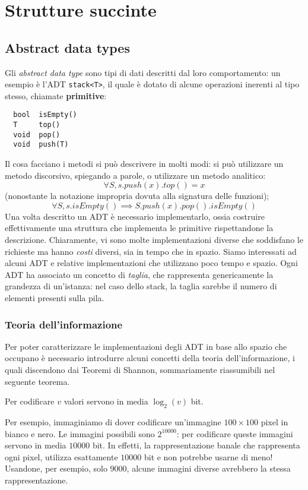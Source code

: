 \chapter{Strutture succinte}
\section{Abstract data types}
Gli \textit{abstract data type} sono tipi di dati descritti dal loro comportamento: un esempio è
l'ADT \texttt{stack<T>}, il quale è dotato di alcune operazioni inerenti al tipo
stesso, chiamate \textbf{primitive}:
\begin{lstlisting}
  bool  isEmpty()
  T     top()
  void  pop()
  void  push(T)
\end{lstlisting}
Il cosa facciano i metodi si può descrivere in molti modi: si può
utilizzare un metodo discorsivo, spiegando a parole, o utilizzare un metodo
analitico:
$$
	\forall S, s.push(x).top() = x
$$
(nonostante la notazione impropria dovuta alla signatura delle funzioni);
$$
	\forall S, s.isEmpty() \implies S.push(x).pop().isEmpty()
$$
Una volta descritto un ADT è necessario implementarlo, ossia costruire effettivamente
una struttura che implementa le primitive rispettandone la descrizione. Chiaramente,
vi sono molte implementazioni diverse che soddisfano le richieste
ma hanno \textit{costi} diversi, sia in tempo che in spazio. Siamo interessati
ad alcuni ADT e relative implementazioni che utilizzano poco tempo e spazio.
Ogni ADT ha associato un concetto di \textit{taglia}, che rappresenta genericamente
la grandezza di un'istanza: nel caso dello stack, la taglia sarebbe il numero
di elementi presenti sulla pila.

\subsection{Teoria dell'informazione}
Per poter caratterizzare le implementazioni degli ADT in base allo
spazio che occupano è necessario introdurre alcuni concetti della teoria
dell'informazione, i quali discendono dai Teoremi di Shannon,
sommariamente riassumibili nel seguente teorema.

\begin{theorem}
	\label{thm:shannon}
	Per codificare $v$ valori servono in media $\log_2(v)$ bit.
\end{theorem}

Per esempio, immaginiamo di dover codificare un'immagine $100\times100$ pixel
in bianco e nero. Le immagini possibili sono $2^{10000}$: per codificare
queste immagini servono in media $10000$ bit. In effetti, la
rappresentazione banale che rappresenta ogni pixel, utilizza esattamente
$10000$ bit e non potrebbe usarne di meno! Usandone, per esempio, solo
$9000$, alcune immagini diverse avrebbero la stessa rappresentazione.

